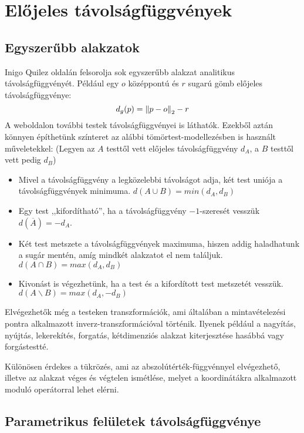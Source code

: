 \section{Előjeles távolságfüggvények}


\subsection{Egyszerűbb alakzatok}
Inigo Quilez oldalán \cite{QuilezDistanceFunctions} felsorolja sok egyszerűbb alakzat analitikus távolságfüggvényét. Például egy $o$ középpontú és $r$ sugarú gömb előjeles távolságfüggvénye:
$$ d_{g}(p) = \norm{p-o}_2 - r $$
A weboldalon további testek távolságfüggvényei is láthatók. Ezekből aztán könnyen építhetünk színteret az alábbi tömörtest-modellezésben is használt műveletekkel: (Legyen az $A$ testtől vett előjeles távolságfüggvény $d_A$, a $B$ testtől vett pedig $d_B$)

\begin{itemize}
	\item Mivel a távolságfüggvény a legközelebbi távolságot adja, két test uniója a távolságfüggvények minimuma. $d(A\cup B) = min(d_A, d_B)$
	\item  Egy test ,,kifordítható'', ha a távolságfüggvény $-1$-szeresét vesszük $d\left(\overline{A}\right) = -d_A$.
	\item Két test metszete a távolságfüggvények maximuma, hiszen addig haladhatunk a sugár mentén, amíg mindkét alakzatot el nem találjuk. $d(A\cap B) = max(d_A, d_B)$
	\item Kivonást is végezhetünk, ha a test és a kifordított test metszetét vesszük. $d(A\backslash B) = max(d_A,-d_B)$ 
\end{itemize}

Elvégezhetők még a testeken transzformációk, ami általában a mintavételezési pontra alkalmazott inverz-transzformációval történik. Ilyenek például a nagyítás, nyújtás, lekerekítés, forgatás, kétdimenziós alakzat kiterjesztése hasábbá vagy forgástestté.

Különösen érdekes a tükrözés, ami az abszolútérték-függvénnyel elvégezhető, illetve az alakzat véges és végtelen ismétlése, melyet a koordinátákra alkalmazott moduló operátorral lehet elérni. \cite{QuilezDistanceFunctions}


\subsection{Parametrikus felületek távolságfüggvénye}

